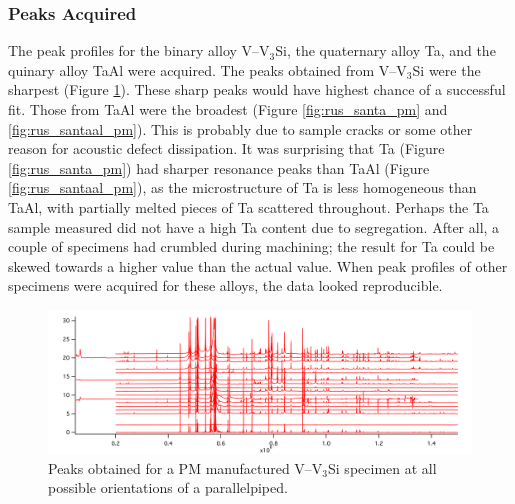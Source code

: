 \subsubsection{Peaks Acquired}
%
The peak profiles for the binary alloy V--V$_3$Si, the quaternary alloy Ta, and the quinary alloy TaAl were acquired.  The peaks obtained from V--V$_3$Si were the sharpest (Figure \ref{fig:rus_v_pm}).  These sharp peaks would have highest chance of a successful fit.  Those from TaAl were the broadest (Figure \ref{fig:rus_santa_pm} and \ref{fig:rus_santaal_pm}).  This is probably due to sample cracks or some other reason for acoustic defect dissipation.  It was surprising that Ta (Figure \ref{fig:rus_santa_pm}) had sharper resonance peaks than TaAl (Figure \ref{fig:rus_santaal_pm}), as the microstructure of Ta is less homogeneous than TaAl, with partially melted pieces of Ta scattered throughout.  Perhaps the Ta sample measured did not have a high Ta content due to segregation.  After all, a couple of specimens had crumbled during machining; the result for Ta could be skewed towards a higher value than the actual value.  When peak profiles of other specimens were acquired for these alloys, the data looked reproducible. 

%
\begin{figure}[H]
\begin{center}
\includegraphics[width=17cm]{RUS_v_pm}
\caption{Peaks obtained for a PM manufactured V--V$_3$Si specimen at all possible orientations of a parallelpiped.}
\label{fig:rus_v_pm}
\end{center}
\end{figure}
%



